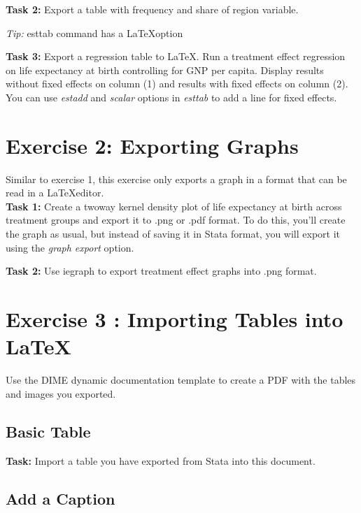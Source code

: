 \documentclass[12pts]{report}
\newenvironment{centerverbatim}{%
	\par
	\centering
	\varwidth{\linewidth}%
	\verbatim
}{%
	\endverbatim
	\endvarwidth
	\par
}
\begin{document}
\textbf{Task 2:}  Export a table with frequency and share of region variable. 
\begin{center}
	\colorbox{BurntOrange}{\emph{Tip:} esttab command has a \LaTeX\space option}
\end{center}

\textbf{Task 3:} Export a regression table to \LaTeX. Run a treatment effect regression on life expectancy at birth controlling for GNP per capita. Display results without fixed effects on column (1) and results with fixed effects on column (2). You can use \textit{estadd} and \textit{scalar} options in \textit{esttab} to add a line for fixed effects.

\section*{Exercise 2: Exporting Graphs}
Similar to exercise 1, this exercise only exports a graph in a format that can be read in a \LaTeX\space editor. \\

\textbf{Task 1:}  Create a twoway kernel density plot of life expectancy at birth across treatment groups and export it to .png or .pdf format. To do this, you'll create the graph as usual, but instead of saving it in Stata format, you will export it using the \textit{graph export} option. 

\textbf{Task 2:}  Use iegraph to export treatment effect graphs into .png format.

\section*{Exercise 3 : Importing Tables into \LaTeX}
Use the DIME dynamic documentation template to create a PDF with the tables and images you exported.

\subsection*{Basic Table}

\textbf{Task:} Import a table you have exported from Stata into this document.
\begin{centerverbatim}

\end{centerverbatim}
		
	

\subsection*{Add a Caption}
\end{document}
